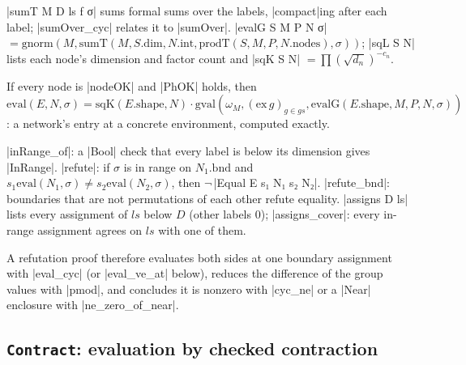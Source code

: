 \begin{definition}
\lean|sumT M D ls f σ| sums formal sums over the labels, \lean|compact|ing after each label;
\lean|sumOver_cyc| relates it to \lean|sumOver|. \lean|evalG S M P N σ| $=\mathrm{gnorm}(M,\mathrm{sumT}(M,S.\mathrm{dim},N.\mathrm{int},\mathrm{prodT}(S,M,P,N.\mathrm{nodes}),\sigma))$;
\lean|sqL S N| lists each node's dimension and factor count and \lean|sqK S N|
$=\prod(\sqrt{d_n})^{-c_n}$.
\end{definition}

\begin{theorem}
If every node is \lean|nodeOK| and \lean|PhOK| holds, then
$\mathrm{eval}(E,N,\sigma)=\mathrm{sqK}(E.\mathrm{shape},N)\cdot\mathrm{gval}(\omega_M,(\mathrm{ex}\,g)_{g\in gs},
\mathrm{evalG}(E.\mathrm{shape},M,P,N,\sigma))$: a network's entry at a concrete environment, computed
exactly.
\end{theorem}

\begin{theorem}[Refutation]
\lean|inRange_of|: a \lean|Bool| check that every label is below its dimension gives
\lean|InRange|. \lean|refute|: if $\sigma$ is in range on $N_1.\mathrm{bnd}$ and $s_1\mathrm{eval}(N_1,\sigma)\ne
s_2\mathrm{eval}(N_2,\sigma)$, then $\lnot\,$\lean|Equal E s₁ N₁ s₂ N₂|. \lean|refute_bnd|: boundaries that
are not permutations of each other refute equality. \lean|assigns D ls| lists every assignment of
$ls$ below $D$ (other labels $0$); \lean|assigns_cover|: every in-range assignment agrees on $ls$
with one of them.
\end{theorem}
A refutation proof therefore evaluates both sides at one boundary assignment with
\lean|eval_cyc| (or \lean|eval_ve_at| below), reduces the difference of the group values with
\lean|pmod|, and concludes it is nonzero with \lean|cyc_ne| or a \lean|Near| enclosure with
\lean|ne_zero_of_near|.

\subsection{\texttt{Contract}: evaluation by checked contraction}

